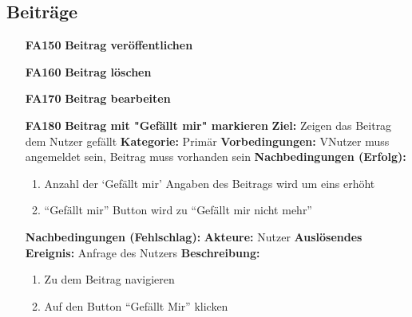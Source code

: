 \documentclass[parskip=full]{scrartcl}
\begin{document}
		\subsection{Beiträge}
		\begin{itemize}[nosep]
			\item[\textbf{FA150}]\textbf{Beitrag veröffentlichen}
			
			\item[\textbf{FA160}]\textbf{Beitrag löschen}
			
			\item[\textbf{FA170}]\textbf{Beitrag bearbeiten}
			
			\item[\textbf{FA180}]\textbf{Beitrag mit "Gefällt mir" markieren}
						\newline \textbf{Ziel:} Zeigen das Beitrag dem Nutzer gefällt
						\newline \textbf{Kategorie:} Primär
						\newline \textbf{Vorbedingungen:} VNutzer muss angemeldet sein, Beitrag muss vorhanden sein
						\newline \textbf{Nachbedingungen (Erfolg):} 
						\begin{enumerate}[nosep]
							\item Anzahl der ‘Gefällt mir’ Angaben des Beitrags wird um eins erhöht
							\item “Gefällt mir” Button wird zu “Gefällt mir nicht mehr”
						\end{enumerate}
						\textbf{Nachbedingungen (Fehlschlag):}
						\newline \textbf{Akteure:} Nutzer
						\newline \textbf{Auslösendes Ereignis:} Anfrage des Nutzers
						\newline \textbf{Beschreibung:}
						\begin{enumerate}[nosep]
							\item Zu dem Beitrag navigieren
							\item Auf den Button “Gefällt Mir” klicken\\
						\end{enumerate}
					

\end{itemize}
\end{document}
